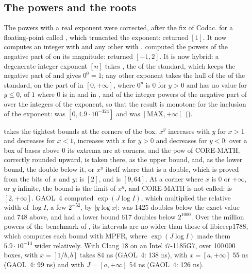 \subsection{The powers and the roots}
\label{sec:changes-powers}
%

The powers with a real exponent were corrected, after the fix of
Codac.\newinvfive{}  for a floating-point  called
, which truncated the exponent: 
returned $[1]$. It now computes an integer  with 
and any other  with .  computed the
powers of the negative part of  on its magnitude:  returned $[-1, 2]$. It is now hybrid: a degenerate integer exponent
$[n]$ takes , the  of the standard, which keeps
the negative part of  and gives $0^0 = 1$; any other exponent takes
the hull of the  of the standard, on the part of  in
$[0, +\infty]$, where $0^y$ is 0 for $y > 0$ and has no value for
$y \leq 0$, of $1$ where 0 is in  and in , and of the integer
powers of the negative part of  over the integers of the exponent, so
that the result is monotone for the inclusion of the exponent:
 was $[0, 4.9 \cdot 10^{-324}]$ and
 was $[\mathrm{MAX}, +\infty]$
().

\medskip
{} takes the tightest bounds at the corners of the
box.\newinvfive{} $x^y$ increases with $y$ for $x > 1$ and decreases for
$x < 1$, increases with $x$ for $y > 0$ and decreases for $y < 0$: over a box
of bases above 0 its extrema are at corners, and the pow of CORE-MATH,
correctly rounded upward, is taken there, as the upper bound, and, as the
lower bound, the double below it, or $x^y$ itself where that is a double,
which is proved from the bits of $x$ and $y$:  is $[2]$,
and  is $[9, 64]$. At a corner where $x$ is 0 or
$+\infty$, or $y$ infinite, the bound is the limit of $x^y$, and CORE-MATH
is not called:  is $[2, +\infty]$. GAOL~4 computed
$\exp(J \log I)$, which multiplied the relative width of $\log I$, a few
$2^{-52}$, by $|y \log x|$:  was 1425 doubles below
the exact value and 748 above, and 
had a lower bound 617 doubles below $2^{1000}$. Over the million powers of
the benchmark of , its intervals are no wider than those of
libieeep1788, which computes each bound with MPFR, where $\exp(J \log I)$
made them $5.9 \cdot 10^{-14}$ wider relatively. With Clang 18 on an Intel
i7-1185G7, over 100\,000 boxes,  with $x = [1/b, b]$
takes 84 ns (GAOL~4: 138 ns), with $x = [a, +\infty]$ 55 ns (GAOL~4: 99 ns)
and with $J = [a, +\infty]$ 54 ns (GAOL~4: 126 ns).

